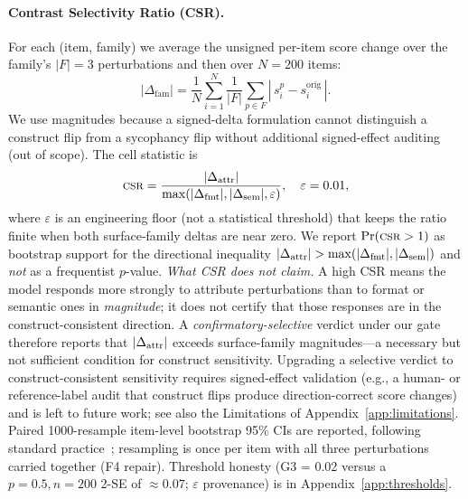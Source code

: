 \paragraph{Contrast Selectivity Ratio (CSR).}
For each (item, family) we average the unsigned per-item score change
over the family's $|F|=3$ perturbations and then over $N=200$ items:
\[
|\Delta_{\mathrm{fam}}|
= \frac{1}{N} \sum_{i=1}^{N}
  \frac{1}{|F|} \sum_{p \in F}
  \left|\, s_i^{p} - s_i^{\mathrm{orig}}\, \right|.
\]
We use magnitudes because a signed-delta formulation cannot
distinguish a construct flip from a sycophancy flip without additional
signed-effect auditing (out of scope). The cell statistic is
\[
\textsc{csr} = \frac{|\Delta_{\mathrm{attr}}|}{\max(|\Delta_{\mathrm{fmt}}|, |\Delta_{\mathrm{sem}}|, \varepsilon)},
\quad \varepsilon = 0.01,
\]
where $\varepsilon$ is an engineering floor (not a statistical
threshold) that keeps the ratio finite when both surface-family
deltas are near zero. We report $\Pr(\textsc{csr} > 1)$ as bootstrap support
for the directional inequality $|\Delta_{\mathrm{attr}}| > \max(|\Delta_{\mathrm{fmt}}|, |\Delta_{\mathrm{sem}}|)$
and \emph{not} as a frequentist $p$-value.
\emph{What CSR does not claim.} A high CSR means the model responds
more strongly to attribute perturbations than to format or semantic
ones in \emph{magnitude}; it does not certify that those responses
are in the construct-consistent direction. A
\emph{confirmatory-selective} verdict under our gate therefore
reports that $|\Delta_{\mathrm{attr}}|$ exceeds surface-family magnitudes---a
necessary but not sufficient condition for construct sensitivity.
Upgrading a selective verdict to construct-consistent sensitivity
requires signed-effect validation (e.g., a human- or reference-label
audit that construct flips produce direction-correct score changes)
and is left to future work; see also the Limitations of
Appendix~\ref{app:limitations}. Paired 1000-resample
item-level bootstrap 95\% CIs are reported, following standard
practice~\cite{efron1993bootstrap}; resampling is once per item with
all three perturbations carried together (F4 repair). Threshold
honesty (G3 = 0.02 versus a $p=0.5, n=200$ 2-SE of $\approx 0.07$;
$\varepsilon$ provenance) is in Appendix~\ref{app:thresholds}.

